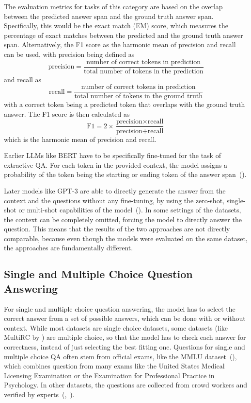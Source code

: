 The evaluation metrics for tasks of this category are based on the overlap between the predicted answer span and the ground truth answer span.
Specifically, this would be the exact match (EM) score, which measures the percentage of exact matches between the predicted and the ground truth answer span.
Alternatively, the F1 score as the harmonic mean of precision and recall can be used, with precision being defined as
\[ \text{precision} = \frac{\text{number of correct tokens in prediction}}{\text{total number of tokens in the prediction}} \]
and recall as
\[ \text{recall} = \frac{\text{number of correct tokens in prediction}}{\text{total number of tokens in the ground truth}} \]
with a correct token being a predicted token that overlaps with the ground truth answer.
The F1 score is then calculated as
\[ \text{F1} = 2 \times \frac{\text{precision} \times \text{recall}}{\text{precision} + \text{recall}} \]
which is the harmonic mean of precision and recall.

Earlier LLMs like BERT have to be specifically fine-tuned for the task of extractive QA.
For each token in the provided context, the model assigns a probability of the token being the starting or ending token of the answer span~(\cite{devlin:2018:BERT}).

Later models like GPT-3 are able to directly generate the answer from the context and the questions without any fine-tuning, by using the zero-shot, single-shot or multi-shot capabilities of the model~(\cite{brown:2020:Language}).
In some settings of the datasets, the context can be completely omitted, forcing the model to directly answer the question.
This means that the results of the two approaches are not directly comparable, because even though the models were evaluated on the same dataset, the approaches are fundamentally different.

\subsection{Single and Multiple Choice Question Answering}\label{sec:multiple-choice-qa}
For single and multiple choice question answering, the model has to select the correct answer from a set of possible answers, which can be done with or without context.
While most datasets are single choice datasets, some datasets (like MultiRC by \cite{khashabi:2018:Looking}) are multiple choice, so that the model has to check each answer for correctness, instead of just selecting the best fitting one.
Questions for single and multiple choice QA often stem from official exams, like the MMLU dataset~(\cite{hendrycks:2020:Measuring}), which combines question from many exams like the United States Medical Licensing Examination or the Examination for Professional Practice in Psychology.
In other datasets, the questions are collected from crowd workers and verified by experts~(\cite{clark:2018:Think},~\cite{mihaylov:2018:Can}).

